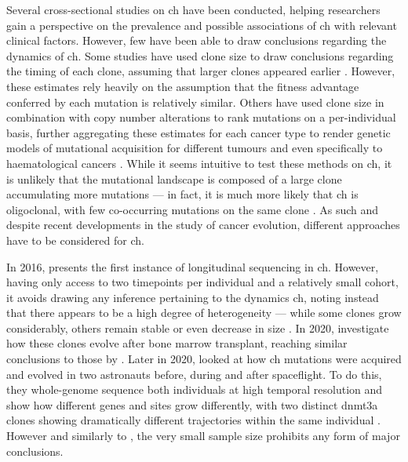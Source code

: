 Several cross-sectional studies on \ac{ch} have been conducted, helping researchers gain a perspective on the prevalence and possible associations of \ac{ch} with relevant clinical factors. However, few have been able to draw conclusions regarding the dynamics of \ac{ch}. Some studies have used clone size to draw conclusions regarding the timing of each clone, assuming that larger clones appeared earlier \cite{Li2018-vz}. However, these estimates rely heavily on the assumption that the fitness advantage conferred by each mutation is relatively similar. Others have used clone size in combination with copy number alterations to rank mutations on a per-individual basis, further aggregating these estimates for each cancer type to render genetic models of mutational acquisition for different tumours \cite{Jolly2018-yb,Gerstung2020-kf} and even specifically to haematological cancers \cite{Papaemmanuil2013-yt}. While it seems intuitive to test these methods on \ac{ch}, it is unlikely that the mutational landscape is composed of a large clone accumulating more mutations --- in fact, it is much more likely that \ac{ch} is oligoclonal, with few co-occurring mutations on the same clone \cite{Miles2020-fz,Mitchell2021-zl,Saiki2021-sq}. As such and despite recent developments in the study of cancer evolution, different approaches have to be considered for \ac{ch}.

In 2016,  presents the first instance of longitudinal sequencing in \ac{ch}. However, having only access to two timepoints per individual and a relatively small cohort, it avoids drawing any inference pertaining to the dynamics \ac{ch}, noting instead that there appears to be a high degree of heterogeneity --- while some clones grow considerably, others remain stable or even decrease in size \cite{Young2016-du}. In 2020,  investigate how these clones evolve after bone marrow transplant, reaching similar conclusions to those by  \cite{Suarez-Gonzalez2020-hn}. Later in 2020,  looked at how \ac{ch} mutations were acquired and evolved in two astronauts before, during and after spaceflight. To do this, they whole-genome sequence both individuals at high temporal resolution and show how different genes and sites grow differently, with two distinct \ac{dnmt3a} clones showing dramatically different trajectories within the same individual \cite{Mencia-Trinchant2020-eb}. However and similarly to \cite{Young2016-du}, the very small sample size prohibits any form of major conclusions.

